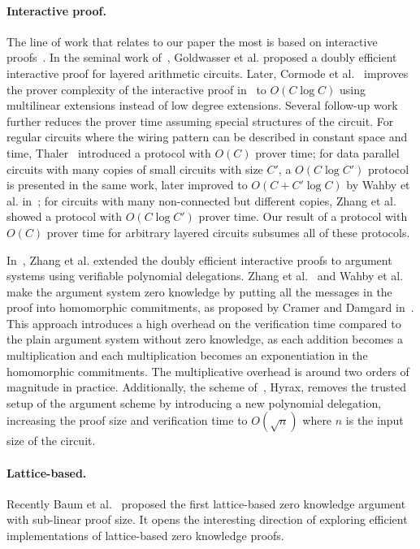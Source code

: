 \paragraph{Interactive proof.} The line of work that relates to our paper the most is based on interactive proofs~\cite{goldwasser1989knowledge}. In the seminal work of~\cite{GKR}, Goldwasser et al. proposed a doubly efficient interactive proof for layered arithmetic circuits. Later, Cormode et al.~\cite{CMT} improves the prover complexity of the interactive proof in~\cite{GKR} to $O(C\log C)$ using multilinear extensions instead of low degree extensions. Several follow-up work further reduces the prover time assuming special structures of the circuit. For regular circuits where the wiring pattern can be described in constant space and time, Thaler~\cite{JT_Thesis} introduced a protocol with $O(C)$ prover time; for data parallel circuits with many copies of small circuits with size $C'$, a $O(C\log C')$ protocol is presented in the same work, later improved to $O(C+C'\log C)$ by Wahby et al. in~\cite{wahby2017full}; for circuits with many non-connected but different copies, Zhang et al. showed a protocol with $O(C\log C')$ prover time. Our result of a protocol with $O(C)$ prover time for arbitrary layered circuits subsumes all of these protocols. 

In~\cite{zhang2017vsql}, Zhang et al. extended the doubly efficient interactive proofs to argument systems using verifiable polynomial delegations. Zhang et al.~\cite{vram} and Wahby et al.~\cite{hyrax} make the argument system zero knowledge by putting all the messages in the proof into homomorphic commitments, as proposed by Cramer and Damgard in~\cite{cramer1998zero}. This approach introduces a high overhead on the verification time compared to the plain argument system without zero knowledge, as each addition becomes a multiplication and each multiplication becomes an exponentiation in the homomorphic commitments. The multiplicative overhead is around two orders of magnitude in practice. Additionally, the scheme of~\cite{hyrax}, Hyrax, removes the trusted setup of the argument scheme by introducing a new polynomial delegation, increasing the proof size and verification time to $O(\sqrt{n})$ where $n$ is the input size of the circuit. 

\paragraph{Lattice-based.} Recently Baum et al.~\cite{baum2018sub} proposed the first lattice-based zero knowledge argument with sub-linear proof size. It opens the interesting direction of exploring efficient implementations of lattice-based zero knowledge proofs.